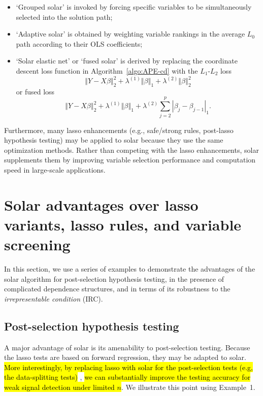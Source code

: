 \documentclass[11pt,review,authoryear]{elsarticle}
\begin{document}
\begin{itemize}
  \item `Grouped solar' is invoked by forcing specific variables to be simultaneously selected into the solution path;
  \item `Adaptive solar' is obtained by weighting variable rankings in the average $L_0$ path according to their OLS coefficients;
  \item `Solar elastic net' or `fused solar' is derived by replacing the coordinate descent loss function in Algorithm~\ref{algo:APE-cd} with the $L_1$-$L_2$ loss
    \begin{equation}
      \left\Vert Y -X\beta \right\Vert_2^2 + \lambda^{(1)} \left\Vert \beta \right\Vert_1 + \lambda^{(2)} \left\Vert \beta \right\Vert_2^2
    \end{equation}
    or fused loss
    \begin{equation}
      \left\Vert Y -X\beta \right\Vert_2^2 + \lambda^{(1)} \left\Vert \beta \right\Vert_1 + \lambda^{(2)} \sum_{j=2}^{p} \left\vert \beta_j - \beta_{j-1} \right\vert_1.
    \end{equation}
\end{itemize}

Furthermore, many lasso enhancements (e.g., safe/strong rules, post-lasso hypothesis testing) may be applied to solar because they use the same optimization methods. Rather than competing with the lasso enhancements, solar supplements them by improving variable selection performance and computation speed in large-scale applications.

\section{Solar advantages over lasso variants, lasso rules, and variable screening \label{section:adv}}

In this section, we use a series of examples to demonstrate the advantages of the solar algorithm for post-selection hypothesis testing, in the presence of complicated dependence structures, and in terms of its robustness to the \emph{irrepresentable condition} (IRC).

\subsection{Post-selection hypothesis testing}

A major advantage of solar is its amenability to post-selection testing. Because the lasso tests \citep{lockhartall14, taylor2014exact} are based on forward regression, they may be adapted to solar. \hl{More interestingly, by replacing lasso with solar for the post-selection tests (e.g, the data-splitting tests)} \citep{wasserman2009high,meinshausen2009p}, \hl{we can substantially improve the testing accuracy for weak signal detection under limited $n$}. We illustrate this point using Example~1.
\end{document}
